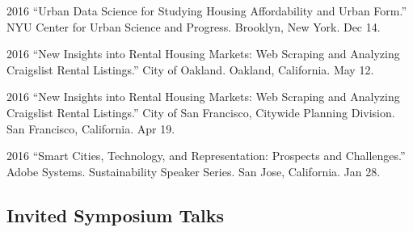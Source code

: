 \documentclass[11pt,letterpaper]{report}
\begin{document}
\begin{tablist}
        \item[2016] \tab{}\enquote{Urban Data Science for Studying Housing Affordability and Urban Form.} NYU Center for Urban Science and Progress. Brooklyn, New York. Dec 14.

        \item[2016] \tab{}\enquote{New Insights into Rental Housing Markets: Web Scraping and Analyzing Craigslist Rental Listings.} City of Oakland. Oakland, California. May 12.

        \item[2016] \tab{}\enquote{New Insights into Rental Housing Markets: Web Scraping and Analyzing Craigslist Rental Listings.} City of San Francisco, Citywide Planning Division. San Francisco, California. Apr 19.

        \item[2016] \tab{}\enquote{Smart Cities, Technology, and Representation: Prospects and Challenges.} Adobe Systems. Sustainability Speaker Series. San Jose, California. Jan 28.

    \end{tablist}

    \subsection*{Invited Symposium Talks}
\end{document}
